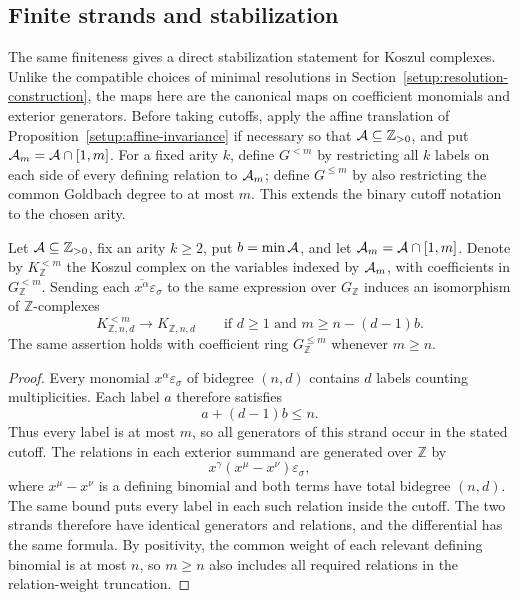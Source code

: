\subsection{Finite strands and stabilization}
The same finiteness gives a direct stabilization statement for
Koszul complexes. Unlike the compatible choices of minimal
resolutions in Section~\ref{setup:resolution-construction}, the maps
here are the canonical maps on coefficient monomials and exterior
generators. Before taking cutoffs, apply the affine translation of
Proposition~\ref{setup:affine-invariance} if necessary so that
$\mathcal A\subseteq\mathbb Z_{>0}$, and put $\mathcal A_m=\mathcal A\cap[1,m]$.
For a fixed arity $k$, define $G^{<m}$ by restricting all
$k$ labels on each side of every defining relation to $\mathcal A_m$; define
$G^{\le m}$ by also restricting the common Goldbach degree to at most
$m$. This extends the binary cutoff notation to the chosen arity.

\begin{proposition}
\label{setup:stabilization}
Let $\mathcal A\subseteq\mathbb Z_{>0}$, fix an arity $k\ge2$, put
$b=\min\mathcal A$, and let $\mathcal A_m=\mathcal A\cap[1,m]$.
Denote by $K_{\mathbb Z}^{<m}$ the Koszul
complex on the variables indexed by $\mathcal A_m$, with coefficients in
$G_{\mathbb Z}^{<m}$. Sending each
$\overline{x^\alpha}\varepsilon_\sigma$ to the same expression over
$G_{\mathbb Z}$ induces an isomorphism of $\mathbb Z$-complexes
\[
 K_{\mathbb Z,n,d}^{<m}
 \longrightarrow K_{\mathbb Z,n,d}
 \qquad\text{if }d\ge1\text{ and }m\ge n-(d-1)b.
\]
The same assertion holds with coefficient ring
$G_{\mathbb Z}^{\le m}$ whenever $m\ge n$.
\end{proposition}
\begin{proof}
Every monomial $x^\alpha\varepsilon_\sigma$ of bidegree $(n,d)$
contains $d$ labels counting multiplicities. Each label $a$ therefore
satisfies
\[
 a+(d-1)b\le n.
\]
Thus every label is at most $m$, so all generators of this strand
occur in the stated cutoff.
The relations in each exterior summand are generated over $\mathbb Z$
by
\[
 x^\gamma(x^\mu-x^\nu)\varepsilon_\sigma,
\]
where $x^\mu-x^\nu$ is a defining binomial and both terms have total
bidegree $(n,d)$. The same bound puts every label in each such relation
inside the cutoff. The two strands therefore have identical generators
and relations, and the differential has the same formula.
By positivity, the common weight of each relevant defining
binomial is at most $n$, so $m\ge n$ also includes all required relations
in the relation-weight truncation.
\end{proof}

